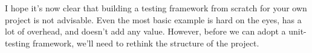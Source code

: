 I hope it’s now clear that building a testing framework from scratch for your own project is not advisable. Even the most basic example is hard on the eyes, has a lot of overhead, and doesn’t add any value. However, before we can adopt a unit-testing framework, we’ll need to rethink the structure of the project.






































